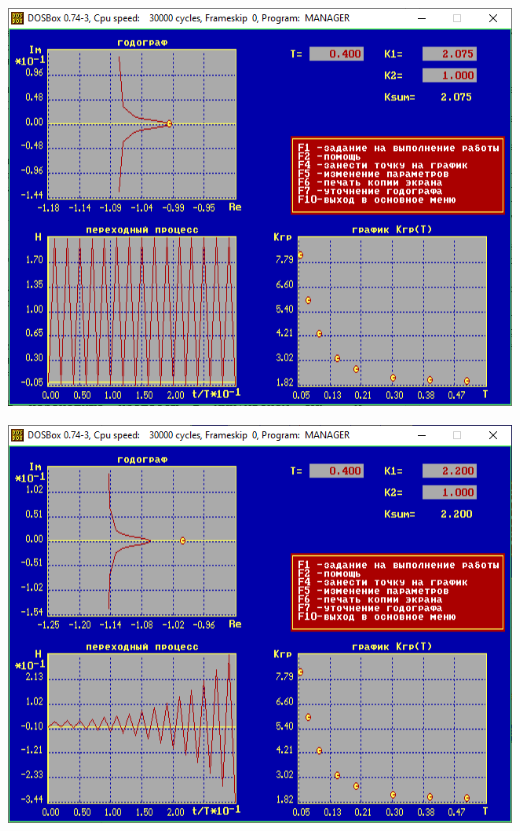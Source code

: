 	\begin{center}
		\noindent \begin{minipage}{.45\textwidth}
			\includegraphics[width=\textwidth]{png/graph4.png}
		\end{minipage} \begin{minipage}{.45\textwidth}
			\includegraphics[width=\textwidth]{png/graph5.png}
		\end{minipage}
		\begin{minipage}{.45\textwidth}

\end{minipage}
\end{center}
